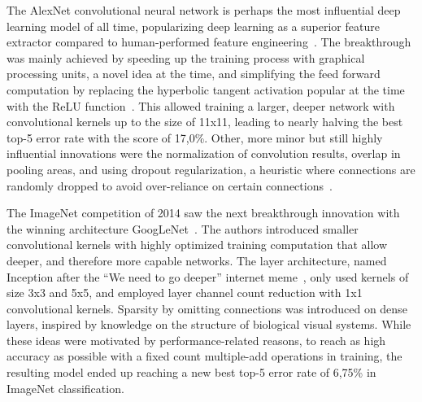 \documentclass[english,twoside,openright]{UH_DS_MSc}
\begin{document}
The AlexNet convolutional neural network is perhaps the most influential deep learning model of all time, 
popularizing deep learning as a superior feature extractor compared to human-performed feature engineering~\cite{princebook}.
The breakthrough was mainly achieved by speeding up the training process with graphical processing units, a novel idea at the time, and simplifying the feed forward computation by replacing the
hyperbolic tangent activation popular at the time with the ReLU function~\cite{alexnet}.
 This allowed training a larger, deeper network
with convolutional kernels up to the size of 11x11, leading to nearly halving the best top-5 error rate with the score of
17,0\%. Other, more minor but still highly influential innovations were the normalization of convolution results, 
overlap in pooling areas, and using dropout regularization, a heuristic where connections are randomly dropped to avoid over-reliance on certain connections~\cite{dropout}.

The ImageNet competition of 2014 saw the next breakthrough innovation with the winning architecture GoogLeNet~\cite{googlelenet}. The authors
introduced smaller convolutional kernels with highly optimized training computation that allow deeper,
and therefore more capable networks. The layer architecture, named Inception after the ``We 
need to go deeper'' internet meme~\cite{we_need_to_go_deeper}, only used kernels of size 3x3 and 5x5, and
employed layer channel count reduction with 1x1 convolutional kernels. Sparsity by omitting connections was introduced on dense layers, inspired by knowledge on the structure of biological visual systems. While these ideas were motivated
by performance-related reasons, to reach as high accuracy as possible with a fixed count multiple-add operations in training, the resulting model ended up reaching a new best top-5 error rate of 6,75\%
in ImageNet classification.
\end{document}

